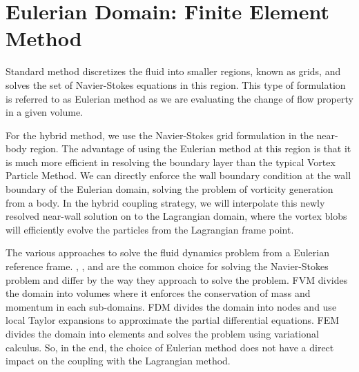 \chapter{Eulerian Domain: Finite Element Method}

	

Standard  method discretizes the fluid into smaller regions, known as grids, and solves the set of Navier-Stokes equations in this region. This type of formulation is referred to as Eulerian method as we are evaluating the change of flow property in a given volume.

For the hybrid method, we use the Navier-Stokes grid formulation in the near-body region. The advantage of using the Eulerian method at this region is that it is much more efficient in resolving the boundary layer than the typical Vortex Particle Method. We can directly enforce the wall boundary condition at the wall boundary of the Eulerian domain, solving the problem of vorticity generation from a body. In the hybrid coupling strategy, we will interpolate this newly resolved near-wall solution on to the Lagrangian domain, where the vortex blobs will efficiently evolve the particles from the Lagrangian frame point.

The various approaches to solve the fluid dynamics problem from a Eulerian reference frame. , , and  are the common choice for solving the Navier-Stokes problem and differ by the way they approach to solve the problem. FVM divides the domain into volumes where it enforces the conservation of mass and momentum in each sub-domains. FDM divides the domain into nodes and use local Taylor expansions to approximate the partial differential equations. FEM divides the domain into elements and solves the problem using variational calculus. So, in the end, the choice of Eulerian method does not have a direct impact on the coupling with the Lagrangian method. 

